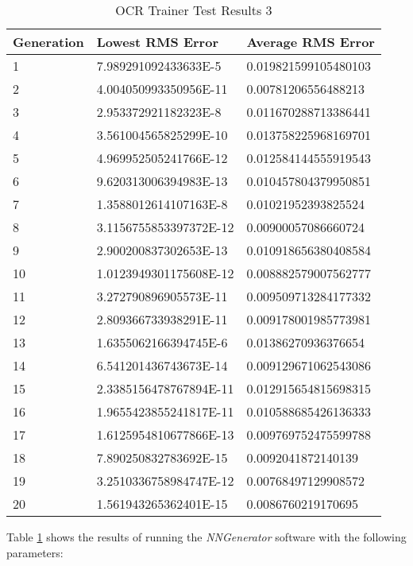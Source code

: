 \begin{center}
    \begin{longtable}{ | l | l | l |}
      \caption{OCR Trainer Test Results 3} \label{ocr3} \\
    \hline
  Generation & Lowest RMS Error & Average RMS Error \\ \hline
1 &	7.989291092433633E-5 &	0.019821599105480103 \\ \hline
2 &	4.004050993350956E-11 &	0.00781206556488213 \\ \hline
3 &	2.953372921182323E-8 &	0.011670288713386441 \\ \hline
4 &	3.561004565825299E-10 &	0.013758225968169701 \\ \hline
5 &	4.969952505241766E-12 &	0.012584144555919543 \\ \hline
6 &	9.620313006394983E-13 &	0.010457804379950851 \\ \hline
7 &	1.3588012614107163E-8 &	0.01021952393825524 \\ \hline
8 &	3.1156755853397372E-12 &	0.00900057086660724 \\ \hline
9 &	2.900200837302653E-13 &	0.010918656380408584 \\ \hline
10 &	1.0123949301175608E-12 &	0.008882579007562777 \\ \hline
11 &	3.272790896905573E-11 &	0.009509713284177332 \\ \hline
12 &	2.809366733938291E-11 &	0.009178001985773981 \\ \hline
13 &	1.6355062166394745E-6 &	0.01386270936376654 \\ \hline
14 &	6.541201436743673E-14 &	0.009129671062543086 \\ \hline
15 &	2.3385156478767894E-11 &	0.012915654815698315 \\ \hline
16 &	1.9655423855241817E-11 &	0.010588685426136333 \\ \hline
17 &	1.6125954810677866E-13 &	0.009769752475599788 \\ \hline
18 &	7.890250832783692E-15 &	0.0092041872140139 \\ \hline
19 &	3.2510336758984747E-12 &	0.00768497129908572 \\ \hline
20 &	1.561943265362401E-15 &	0.0086760219170695 \\ \hline
\end{longtable}
\end{center}

Table \ref{ocr3} shows the results of running the {\it NNGenerator} software with the following parameters:

